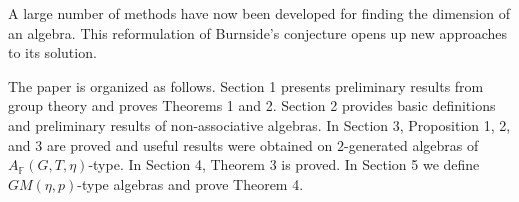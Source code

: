 \documentclass[12pt]{article}
\newcommand\F{\mathbb{F}}
\begin{document}
A large number of methods have now been developed for finding the dimension of an algebra. This reformulation of Burnside's conjecture opens up new approaches to its solution.

The paper is organized as follows. Section 1 presents preliminary results from group theory and proves Theorems 1 and 2. Section 2 provides basic definitions and preliminary results of non-associative algebras. In Section 3, Proposition 1, 2, and 3 are proved and useful results were obtained on $2$-generated algebras of $A_{\F}(G,T,\eta)$-type. In Section 4, Theorem 3 is proved. In Section 5 we define $GM(\eta,p)$-type algebras and prove Theorem 4. 


	
	
	
\end{document}
